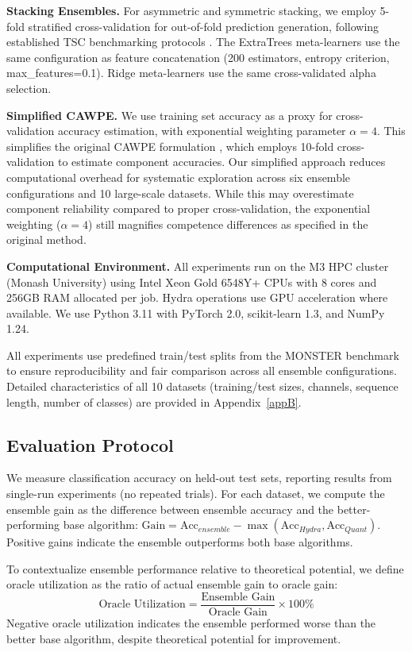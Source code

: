 \documentclass[pdflatex,sn-basic]{sn-jnl}           %
\theoremstyle{thmstyleone}%
\theoremstyle{thmstyletwo}%
\theoremstyle{thmstylethree}%
\begin{document}
\textbf{Stacking Ensembles.} For asymmetric and symmetric stacking, we employ 5-fold stratified cross-validation for out-of-fold prediction generation, following established TSC benchmarking protocols \citep{tsc-bakeoff}. The ExtraTrees meta-learners use the same configuration as feature concatenation (200 estimators, entropy criterion, max\_features=0.1). Ridge meta-learners use the same cross-validated alpha selection.

\textbf{Simplified CAWPE.} We use training set accuracy as a proxy for cross-validation accuracy estimation, with exponential weighting parameter $\alpha=4$. This simplifies the original CAWPE formulation \citep{cawpe}, which employs 10-fold cross-validation to estimate component accuracies. Our simplified approach reduces computational overhead for systematic exploration across six ensemble configurations and 10 large-scale datasets. While this may overestimate component reliability compared to proper cross-validation, the exponential weighting ($\alpha=4$) still magnifies competence differences as specified in the original method.

\textbf{Computational Environment.} All experiments run on the M3 HPC cluster (Monash University) using Intel Xeon Gold 6548Y+ CPUs with 8 cores and 256GB RAM allocated per job. Hydra operations use GPU acceleration where available. We use Python 3.11 with PyTorch 2.0, scikit-learn 1.3, and NumPy 1.24.

All experiments use predefined train/test splits from the MONSTER benchmark to ensure reproducibility and fair comparison across all ensemble configurations. Detailed characteristics of all 10 datasets (training/test sizes, channels, sequence length, number of classes) are provided in Appendix~\ref{appB}.

\subsection{Evaluation Protocol}

We measure classification accuracy on held-out test sets, reporting results from single-run experiments (no repeated trials). For each dataset, we compute the ensemble gain as the difference between ensemble accuracy and the better-performing base algorithm: $\text{Gain} = \text{Acc}_{ensemble} - \max(\text{Acc}_{Hydra}, \text{Acc}_{Quant})$. Positive gains indicate the ensemble outperforms both base algorithms.

To contextualize ensemble performance relative to theoretical potential, we define oracle utilization as the ratio of actual ensemble gain to oracle gain:
\begin{equation}
\text{Oracle Utilization} = \frac{\text{Ensemble Gain}}{\text{Oracle Gain}} \times 100\%
\end{equation}
Negative oracle utilization indicates the ensemble performed worse than the better base algorithm, despite theoretical potential for improvement.
\end{document}
